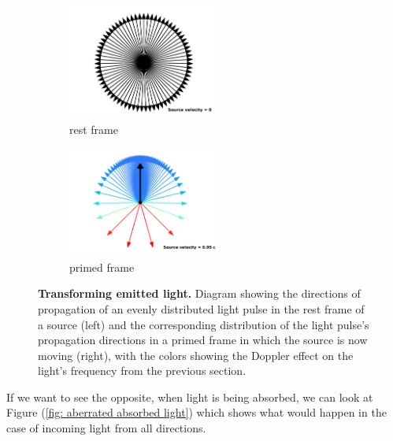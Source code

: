 \begin{figure}[H]
	\begin{subfigure}{.49\textwidth}
		\centering
		\includegraphics[width = 5cm]{images/pdf/Aberrated_velocities_restframe.pdf}
		\caption{rest frame}
	\end{subfigure}
	\begin{subfigure}{.49\textwidth}
		\centering
		\includegraphics[width = 5cm]{images/pdf/Aberrated_velocities.pdf}
		\caption{primed frame}
	\end{subfigure}
	\caption{\textbf{Transforming emitted light.} Diagram showing the directions of propagation of an evenly distributed light pulse in the rest frame of a source (left) and the corresponding distribution of the light pulse's propagation directions in a primed frame in which the source is now moving (right), with the colors showing the Doppler effect on the light's frequency from the previous section.}
	\label{fig: aberrated emitted light}
\end{figure}

If we want to see the opposite, when light is being absorbed, we can look at Figure (\ref{fig: aberrated absorbed light}) which shows what would happen in the case of incoming light from all directions.

